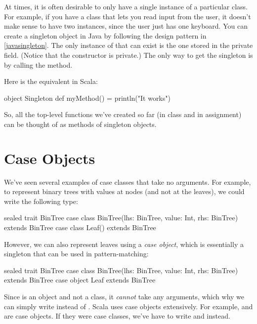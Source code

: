 \documentclass[9pt]{extbook}
\begin{document}
At times, it is often desirable to only have a single instance of a particular
class. For example, if you have a class that lets you read input from the
user, it doesn't make sense to have two instances, since the user just has
one keyboard. You can create a singleton object in Java by following the
design pattern in \cref{javasingleton}. The only instance of 
that can exist is the one stored in the private field. (Notice that the constructor
is private.) The only way to get
the singleton is by calling the  method.

Here is the equivalent in Scala:

\begin{scalacode}
object Singleton {
  def myMethod() = println("It works")
}
\end{scalacode}

So, all the top-level functions we've created so far (in class and in
assignment) can be thought of as methods of singleton objects.

\section{Case Objects}

We've seen several examples of case classes that take no arguments. For example,
to represent binary trees with values at nodes (and not at the leaves), we could
write the following type:
%
\begin{scalacode}
sealed trait BinTree
case class BinTree(lhs: BinTree, value: Int, rhs: BinTree) extends BinTree
case class Leaf() extends BinTree
\end{scalacode}

However, we can also represent leaves using a \emph{case object}, which is essentially
a singleton that can be used in pattern-matching:
%
\begin{scalacode}
sealed trait BinTree
case class BinTree(lhs: BinTree, value: Int, rhs: BinTree) extends BinTree
case object Leaf extends BinTree
\end{scalacode}

Since  is an object and not a class, it \emph{cannot}
take any arguments, which why we can simply write  instead
of . Scala uses case objects extensively. For example,
 and  are case objects. If they
were case classes, we've have to write  and
 instead.
\end{document}

